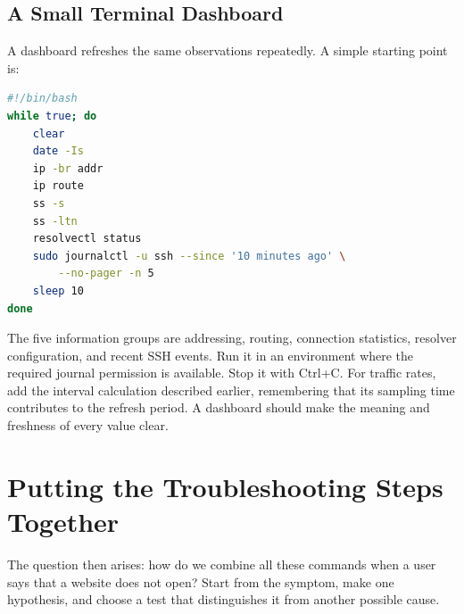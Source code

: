 \documentclass[journal]{IEEEtran}
\begin{document}
\subsection{A Small Terminal Dashboard}
A dashboard refreshes the same observations repeatedly. A simple starting point is:
\begin{lstlisting}[language=bash]
#!/bin/bash
while true; do
    clear
    date -Is
    ip -br addr
    ip route
    ss -s
    ss -ltn
    resolvectl status
    sudo journalctl -u ssh --since '10 minutes ago' \
        --no-pager -n 5
    sleep 10
done
\end{lstlisting}
The five information groups are addressing, routing, connection statistics, resolver configuration, and recent SSH events. Run it in an environment where the required journal permission is available. Stop it with Ctrl+C. For traffic rates, add the interval calculation described earlier, remembering that its sampling time contributes to the refresh period. A dashboard should make the meaning and freshness of every value clear.

\section{Putting the Troubleshooting Steps Together}
The question then arises: how do we combine all these commands when a user says that a website does not open? Start from the symptom, make one hypothesis, and choose a test that distinguishes it from another possible cause.
\end{document}
